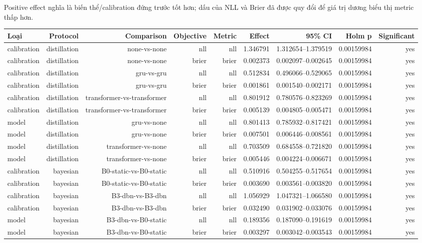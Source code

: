 Positive effect nghĩa là biến thể/calibration đứng trước tốt hơn; dấu của NLL và Brier đã được quy đổi để giá trị dương biểu thị metric thấp hơn.

\begin{table}[!htbp]
\centering
\scriptsize
\setlength{\tabcolsep}{2.5pt}
\begin{adjustbox}{max width=\textwidth}
\begin{tabular}{@{}lrrrrrrrr@{}}
\toprule
Loại & Protocol & Comparison & Objective & Metric & Effect & 95\% CI & Holm p & Significant \\
\midrule
calibration & distillation & none-vs-none & nll & nll & 1.346791 & 1.312654--1.379519 & 0.00159984 & yes \\
calibration & distillation & none-vs-none & brier & brier & 0.002373 & 0.002097--0.002645 & 0.00159984 & yes \\
calibration & distillation & gru-vs-gru & nll & nll & 0.512834 & 0.496066--0.529065 & 0.00159984 & yes \\
calibration & distillation & gru-vs-gru & brier & brier & 0.001861 & 0.001540--0.002171 & 0.00159984 & yes \\
calibration & distillation & transformer-vs-transformer & nll & nll & 0.801912 & 0.780576--0.823269 & 0.00159984 & yes \\
calibration & distillation & transformer-vs-transformer & brier & brier & 0.005139 & 0.004805--0.005471 & 0.00159984 & yes \\
model & distillation & gru-vs-none & nll & nll & 0.801413 & 0.785932--0.817421 & 0.00159984 & yes \\
model & distillation & gru-vs-none & brier & brier & 0.007501 & 0.006446--0.008561 & 0.00159984 & yes \\
model & distillation & transformer-vs-none & nll & nll & 0.703509 & 0.684558--0.721820 & 0.00159984 & yes \\
model & distillation & transformer-vs-none & brier & brier & 0.005446 & 0.004224--0.006671 & 0.00159984 & yes \\
calibration & bayesian & B0-static-vs-B0-static & nll & nll & 0.510916 & 0.504255--0.517654 & 0.00159984 & yes \\
calibration & bayesian & B0-static-vs-B0-static & brier & brier & 0.003690 & 0.003561--0.003820 & 0.00159984 & yes \\
calibration & bayesian & B3-dbn-vs-B3-dbn & nll & nll & 1.056929 & 1.047321--1.066580 & 0.00159984 & yes \\
calibration & bayesian & B3-dbn-vs-B3-dbn & brier & brier & 0.032490 & 0.031902--0.033076 & 0.00159984 & yes \\
model & bayesian & B3-dbn-vs-B0-static & nll & nll & 0.189356 & 0.187090--0.191619 & 0.00159984 & yes \\
model & bayesian & B3-dbn-vs-B0-static & brier & brier & 0.003297 & 0.003042--0.003543 & 0.00159984 & yes \\
\bottomrule
\end{tabular}
\end{adjustbox}
\end{table}

